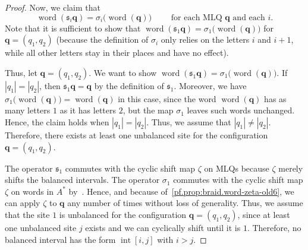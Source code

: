 \documentclass[reqno]{amsart}
\newcommand{\0}{\phantom{c}}
\DeclareMathOperator{\inter}{int} %
\newcommand{\qq}{\mathbf{q}}
\newcommand{\fraks}{\mathfrak{s}}
\newenvironment{verlong}{}{}
\newcommand{\word}{\operatorname{word}}
\newcommand{\abs}[1]{\left| #1 \right|}
\theoremstyle{plain}
\theoremstyle{definition}
\numberwithin{equation}{section}
\begin{document}
\begin{verlong}
\begin{proof}
Now, we claim that
\begin{equation}
 \word(\fraks_i \qq) = \sigma_i\bigl( \word(\qq) \bigr)
 \qquad \text{ for each MLQ } \qq \text{ and each } i .
 \label{pf.prop:braid.inter-old6}
\end{equation}
Note that it is sufficient to show that $\word(\fraks_1 \qq) = \sigma_1\bigl( \word(\qq) \bigr)$ for $\qq = (q_1, q_2)$
(because the definition of $\sigma_i$ only relies on the letters $i$ and $i+1$, while all other letters stay in their places and have no effect).

Thus, let $\qq = (q_1, q_2)$.
We want to show $\word(\fraks_1 \qq) = \sigma_1\bigl( \word(\qq) \bigr)$.
If $\abs{q_1} = \abs{q_2}$, then $\fraks_1 \qq = \qq$ by the definition of $\fraks_1$.
Moreover, we have $\sigma_1\bigl( \word(\qq) \bigr) = \word(\qq)$ in this case, since the word $\word(\qq)$ has as many letters $1$ as it has letters $2$, but the map $\sigma_1$ leaves such words unchanged.
Hence, the claim holds when $\abs{q_1} = \abs{q_2}$.
Thus, we assume that $\abs{q_1} \neq \abs{q_2}$.
Therefore, there exists at least one unbalanced site for the configuration $\qq = (q_1, q_2)$.

The operator $\fraks_1$ commutes with the cyclic shift map $\zeta$ on MLQs because $\zeta$ merely shifts the balanced intervals.
The operator $\sigma_1$ commutes with the cyclic shift map $\zeta$ on words in $A^*$ by~\cite[Prop.~5.6.1]{Loth}.
Hence, and because of~\eqref{pf.prop:braid.word-zeta-old6}, we can apply $\zeta$ to $\qq$ any number of times without loss of generality.
Thus, we assume that the site $1$ is unbalanced for the configuration $\qq = (q_1, q_2)$, since at least one unbalanced site $j$ exists and we can cyclically shift until it is $1$.
Therefore, no balanced interval has the form $\inter[i,j]$ with $i > j$.


\end{proof}
\end{verlong}
\end{document}
